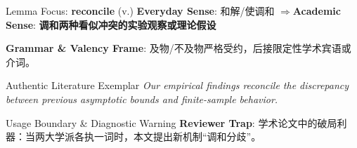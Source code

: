 \begin{ConceptBox}{Lemma Focus: \textbf{reconcile} (v.)}
\textbf{Everyday Sense}: 和解/使调和 \quad$\Longrightarrow$\quad \textbf{Academic Sense}: \textbf{调和两种看似冲突的实验观察或理论假设}\par\vspace{3pt}
\textbf{Grammar \& Valency Frame}: 及物/不及物严格受约，后接限定性学术宾语或介词。\par
\end{ConceptBox}
\begin{ExampleBox}{Authentic Literature Exemplar}
\textit{Our empirical findings reconcile the discrepancy between previous asymptotic bounds and finite-sample behavior.}
\end{ExampleBox}
\begin{TipBox}{Usage Boundary \& Diagnostic Warning}
\textbf{Reviewer Trap}: 学术论文中的破局利器：当两大学派各执一词时，本文提出新机制“调和分歧”。
\end{TipBox}
\vspace{6pt}

